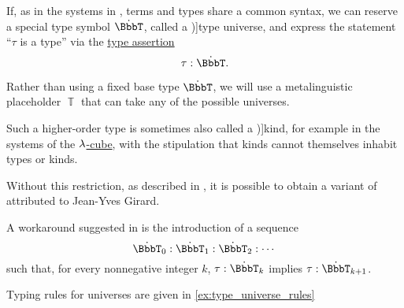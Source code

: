 \begin{concept}\label{con:type_universe}
  If, as in the systems in , terms and types share a common syntax, we can reserve a special type symbol \( \syn\BbbT \), called a \term[en=universe (\cite[\S 1.3]{UnivalentFoundationsProgram2024OctoberHoTT})]{type universe}, and express the statement \enquote{\( \tau \) is a type} via the \hyperref[def:type_assertion]{type assertion}
  \begin{equation*}
    \tau: \syn\BbbT.
  \end{equation*}

  Rather than using a fixed base type \( \syn\BbbT \), we will use a metalinguistic placeholder \( \BbbT \) that can take any of the possible universes.

  Such a higher-order type is sometimes also called a \term[en=kind (\cite[def. 5.2]{Barendregt1992LambdaCalculiWithTypes})]{kind}, for example in the systems of the \hyperref[def:lambda_cube]{\( {\mathrm \lambda} \)-cube}, with the stipulation that kinds cannot themselves inhabit types or kinds.

  Without this restriction, as described in , it is possible to obtain a variant of  attributed to Jean-Yves Girard.

  A workaround suggested in \cite[\S 1.3]{UnivalentFoundationsProgram2024OctoberHoTT} is the introduction of a sequence
  \begin{equation*}
    \syn\BbbT_0: \syn\BbbT_1: \syn\BbbT_2: \cdots
  \end{equation*}
  such that, for every nonnegative integer \( k \), \( \tau: \syn\BbbT_k \) implies \( \tau: \syn\BbbT_{k+1} \).
\end{concept}
\begin{comments}
  \item Typing rules for universes are given in \cref{ex:type_universe_rules}
\end{comments}

